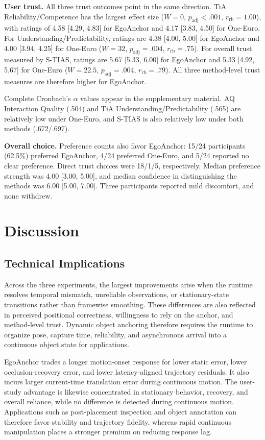 \documentclass[review]{vgtc}
\begin{document}
\textbf{User trust.}
All three trust outcomes point in the same direction. TiA Reliability/Competence has the largest effect size ($W=0$, $p_{\mathrm{adj}}<.001$, $r_{\mathrm{rb}}=1.00$), with ratings of 4.58 [4.29, 4.83] for EgoAnchor and 4.17 [3.83, 4.50] for One-Euro. For Understanding/Predictability, ratings are 4.38 [4.00, 5.00] for EgoAnchor and 4.00 [3.94, 4.25] for One-Euro ($W=32$, $p_{\mathrm{adj}}=.004$, $r_{\mathrm{rb}}=.75$). For overall trust measured by S-TIAS, ratings are 5.67 [5.33, 6.00] for EgoAnchor and 5.33 [4.92, 5.67] for One-Euro ($W=22.5$, $p_{\mathrm{adj}}=.004$, $r_{\mathrm{rb}}=.79$). All three method-level trust measures are therefore higher for EgoAnchor.

Complete Cronbach's $\alpha$ values appear in the supplementary material. AQ Interaction Quality (.504) and TiA Understanding/Predictability (.565) are relatively low under One-Euro, and S-TIAS is also relatively low under both methods (.672/.697).

\textbf{Overall choice.}
Preference counts also favor EgoAnchor: 15/24 participants (62.5\%) preferred EgoAnchor, 4/24 preferred One-Euro, and 5/24 reported no clear preference. Direct trust choices were 18/1/5, respectively. Median preference strength was 4.00 [3.00, 5.00], and median confidence in distinguishing the methods was 6.00 [5.00, 7.00]. Three participants reported mild discomfort, and none withdrew.

\section{Discussion}\label{sec:discussion}

\subsection{Technical Implications}

Across the three experiments, the largest improvements arise when the runtime resolves temporal mismatch, unreliable observations, or stationary-state transitions rather than framewise smoothing. These differences are also reflected in perceived positional correctness, willingness to rely on the anchor, and method-level trust. Dynamic object anchoring therefore requires the runtime to organize pose, capture time, reliability, and asynchronous arrival into a continuous object state for applications.

EgoAnchor trades a longer motion-onset response for lower static error, lower occlusion-recovery error, and lower latency-aligned trajectory residuals. It also incurs larger current-time translation error during continuous motion. The user-study advantage is likewise concentrated in stationary behavior, recovery, and overall reliance, while no difference is detected during continuous motion. Applications such as post-placement inspection and object annotation can therefore favor stability and trajectory fidelity, whereas rapid continuous manipulation places a stronger premium on reducing response lag.
\end{document}
